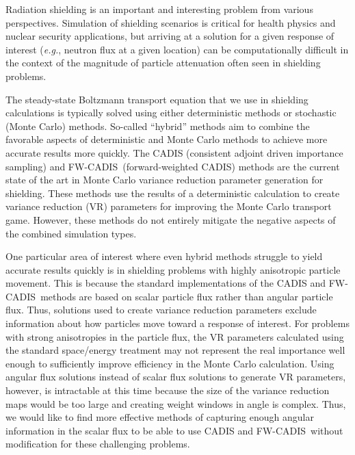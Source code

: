 \documentclass{article} %
\newcommand{\fwc}{\mbox{FW-CADIS}}
\begin{document}
Radiation shielding is an important and interesting problem from various
perspectives. Simulation of shielding scenarios is critical for health physics
and nuclear security applications, but arriving at a solution for a given
response of interest (\textit{e.g.}, neutron flux at a given location) can be
computationally difficult in the context of the magnitude of particle
attenuation often seen in shielding problems.

The steady-state Boltzmann transport equation that we use in shielding
calculations is typically solved using either deterministic methods or
stochastic (Monte Carlo) methods. So-called ``hybrid'' methods aim to combine
the favorable aspects of deterministic and Monte Carlo methods to achieve more
accurate results more quickly. The CADIS (consistent adjoint driven importance
sampling) \cite{cadis} and \fwc\ (forward-weighted CADIS) \cite{fwcadis}
methods are the current state of the art in Monte Carlo variance reduction
parameter generation for shielding. These methods use the results of a
deterministic calculation to create variance reduction (VR) parameters for
improving the Monte Carlo transport game. However, these methods do not
entirely mitigate the negative aspects of the combined simulation types.

One particular area of interest where even hybrid methods struggle to yield
accurate results quickly is in shielding problems with highly anisotropic
particle movement. This is because the standard implementations of the CADIS and
\fwc\ methods are based on scalar particle flux rather than angular particle
flux. Thus, solutions used to create variance reduction parameters exclude
information about how particles move toward a response of interest. For problems
with strong anisotropies in the particle flux, the VR parameters calculated
using the standard space/energy treatment may not represent the real importance
well enough to sufficiently improve efficiency in the Monte Carlo calculation.
Using angular flux solutions instead of scalar flux solutions to generate VR
parameters, however, is intractable at this time because the size of the
variance reduction maps would be too large and creating weight windows in angle
is complex. Thus, we would like to find more effective methods of capturing
enough angular information in the scalar flux to be able to use CADIS and \fwc\
without modification for these challenging problems.
\end{document}
